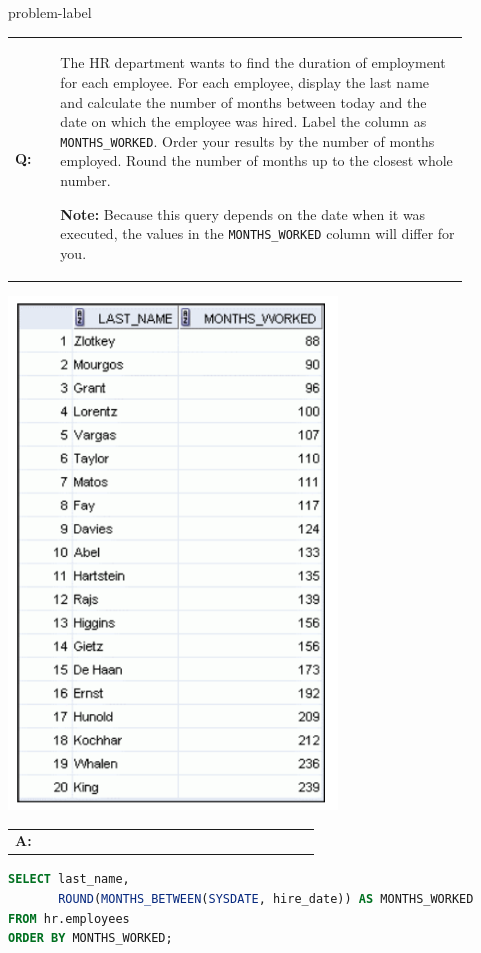 \begin{problem}{}{problem-label}

\begin{tabular}{@{}l p{0.9\linewidth}@{}}
  \textbf{Q:} & The HR department wants to find the duration of employment for each employee. For each employee, display the last name and calculate the number of months between today and the date on which the employee was hired. Label the column as \texttt{MONTHS\_WORKED}. Order your results by the number of months employed. Round the number of months up to the closest whole number.

\textbf{Note:} Because this query depends on the date when it was executed, the values in the \texttt{MONTHS\_WORKED} column will differ for you.
\end{tabular}

\begin{center}
  \includegraphics[scale=0.8]{images/c3q6.png}
\end{center}


\begin{tabular}{@{}l p{0.9\linewidth}@{}}
  \textbf{A:} & 
\end{tabular}


\begin{lstlisting}[language=SQL]
SELECT last_name,
       ROUND(MONTHS_BETWEEN(SYSDATE, hire_date)) AS MONTHS_WORKED
FROM hr.employees
ORDER BY MONTHS_WORKED;
\end{lstlisting}


\end{problem}
